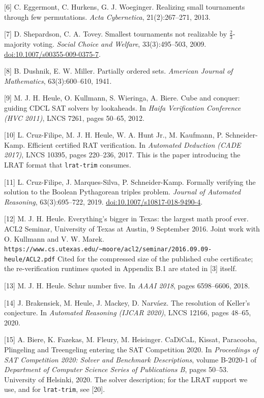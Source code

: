 \documentclass[
]{article}
\begin{document}
{[}6{]} C. Eggermont, C. Hurkens, G. J. Woeginger. Realizing small
tournaments through few permutations. \emph{Acta Cybernetica},
21(2):267--271, 2013.

{[}7{]} D. Shepardson, C. A. Tovey. Smallest tournaments not realizable
by \(\tfrac{2}{3}\)-majority voting. \emph{Social Choice and Welfare},
33(3):495--503, 2009. \url{doi:10.1007/s00355-009-0375-7}.

{[}8{]} B. Dushnik, E. W. Miller. Partially ordered sets. \emph{American
Journal of Mathematics}, 63(3):600--610, 1941.

{[}9{]} M. J. H. Heule, O. Kullmann, S. Wieringa, A. Biere. Cube and
conquer: guiding CDCL SAT solvers by lookaheads. In \emph{Haifa
Verification Conference (HVC 2011)}, LNCS 7261, pages 50--65, 2012.

{[}10{]} L. Cruz-Filipe, M. J. H. Heule, W. A. Hunt Jr., M. Kaufmann, P.
Schneider-Kamp. Efficient certified RAT verification. In \emph{Automated
Deduction (CADE 2017)}, LNCS 10395, pages 220--236, 2017. This is the
paper introducing the LRAT format that \texttt{lrat-trim} consumes.

{[}11{]} L. Cruz-Filipe, J. Marques-Silva, P. Schneider-Kamp. Formally
verifying the solution to the Boolean Pythagorean triples problem.
\emph{Journal of Automated Reasoning}, 63(3):695--722, 2019.
\url{doi:10.1007/s10817-018-9490-4}.

{[}12{]} M. J. H. Heule. Everything's bigger in Texas: the largest math
proof ever. ACL2 Seminar, University of Texas at Austin, 9 September
2016. Joint work with O. Kullmann and V. W. Marek.
\texttt{https://www.cs.utexas.edu/\textasciitilde{}moore/acl2/seminar/2016.09.09-heule/ACL2.pdf}
Cited for the compressed size of the published cube certificate; the
re-verification runtimes quoted in Appendix B.1 are stated in {[}3{]}
itself.

{[}13{]} M. J. H. Heule. Schur number five. In \emph{AAAI 2018}, pages
6598--6606, 2018.

{[}14{]} J. Brakensiek, M. Heule, J. Mackey, D. Narváez. The resolution
of Keller's conjecture. In \emph{Automated Reasoning (IJCAR 2020)}, LNCS
12166, pages 48--65, 2020.

{[}15{]} A. Biere, K. Fazekas, M. Fleury, M. Heisinger. CaDiCaL, Kissat,
Paracooba, Plingeling and Treengeling entering the SAT Competition 2020.
In \emph{Proceedings of SAT Competition 2020: Solver and Benchmark
Descriptions}, volume B-2020-1 of \emph{Department of Computer Science
Series of Publications B}, pages 50--53. University of Helsinki, 2020.
The solver description; for the LRAT support we use, and for
\texttt{lrat-trim}, see {[}20{]}.
\end{document}
